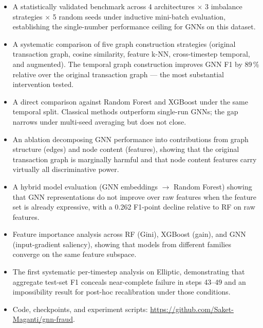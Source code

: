 \begin{itemize}[leftmargin=*]
  \item A statistically validated benchmark across 4 architectures
    $\times$ 3 imbalance strategies $\times$ 5 random seeds under
    inductive mini-batch evaluation, establishing the single-number
    performance ceiling for GNNs on this dataset.

  \item A systematic comparison of five graph construction strategies
    (original transaction graph, cosine similarity, feature k-NN,
    cross-timestep temporal, and augmented). The temporal graph
    construction improves GNN F1 by 89\,\% relative over the original
    transaction graph — the most substantial intervention tested.

  \item A direct comparison against Random Forest and XGBoost under the
    same temporal split. Classical methods outperform single-run GNNs;
    the gap narrows under multi-seed averaging but does not close.

  \item An ablation decomposing GNN performance into contributions from
    graph structure (edges) and node content (features), showing that
    the original transaction graph is marginally harmful and that node
    content features carry virtually all discriminative power.

  \item A hybrid model evaluation (GNN embeddings $\to$ Random Forest)
    showing that GNN representations do not improve over raw features
    when the feature set is already expressive, with a 0.262 F1-point
    decline relative to RF on raw features.

  \item Feature importance analysis across RF (Gini), XGBoost (gain),
    and GNN (input-gradient saliency), showing that models from
    different families converge on the same feature subspace.

  \item The first systematic per-timestep analysis on Elliptic,
    demonstrating that aggregate test-set F1 conceals near-complete
    failure in steps 43--49 and an impossibility result for post-hoc
    recalibration under those conditions.

  \item Code, checkpoints, and experiment scripts:
    \url{https://github.com/Saket-Maganti/gnn-fraud}.
\end{itemize}
